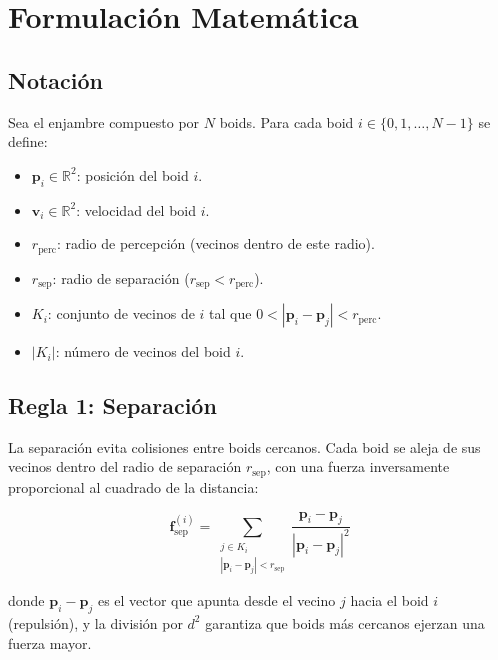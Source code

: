 \documentclass[11pt,a4paper]{article}
\begin{document}
\section{Formulación Matemática}
\label{sec:ecuaciones}

\subsection{Notación}

Sea el enjambre compuesto por $N$ boids. Para cada boid $i \in \{0, 1, \ldots, N-1\}$ se define:
\begin{itemize}
  \item $\mathbf{p}_i \in \mathbb{R}^2$: posición del boid $i$.
  \item $\mathbf{v}_i \in \mathbb{R}^2$: velocidad del boid $i$.
  \item $r_{\text{perc}}$: radio de percepción (vecinos dentro de este radio).
  \item $r_{\text{sep}}$: radio de separación ($r_{\text{sep}} < r_{\text{perc}}$).
  \item $K_i$: conjunto de vecinos de $i$ tal que $0 < |\mathbf{p}_i - \mathbf{p}_j| < r_{\text{perc}}$.
  \item $|K_i|$: número de vecinos del boid $i$.
\end{itemize}

\subsection{Regla 1: Separación}
\label{sec:separacion}

La separación evita colisiones entre boids cercanos. Cada boid se aleja de sus vecinos dentro del radio de separación $r_{\text{sep}}$, con una fuerza inversamente proporcional al cuadrado de la distancia:

\begin{equation}
  \mathbf{f}_{\text{sep}}^{(i)} = \sum_{\substack{j \in K_i \\ |\mathbf{p}_i - \mathbf{p}_j| < r_{\text{sep}}}} \frac{\mathbf{p}_i - \mathbf{p}_j}{|\mathbf{p}_i - \mathbf{p}_j|^2}
  \label{eq:separacion}
\end{equation}

\noindent donde $\mathbf{p}_i - \mathbf{p}_j$ es el vector que apunta desde el vecino $j$ hacia el boid $i$ (repulsión), y la división por $d^2$ garantiza que boids más cercanos ejerzan una fuerza mayor.
\end{document}
